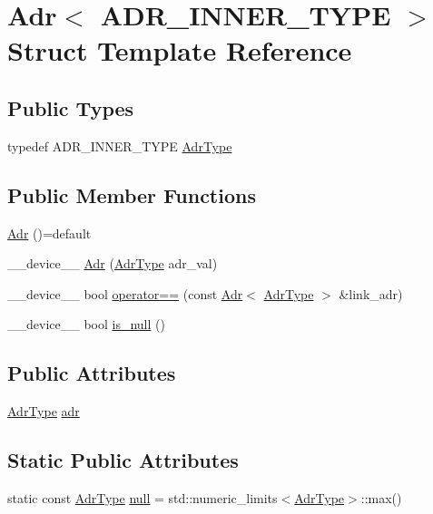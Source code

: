 \hypertarget{structAdr}{\section{Adr$<$ A\-D\-R\-\_\-\-I\-N\-N\-E\-R\-\_\-\-T\-Y\-P\-E $>$ Struct Template Reference}
\label{structAdr}
}
\subsection*{Public Types}
\begin{DoxyCompactItemize}
\item 
typedef A\-D\-R\-\_\-\-I\-N\-N\-E\-R\-\_\-\-T\-Y\-P\-E \hyperlink{structAdr_a26aee6997ae64a7e01a07cf43a9d4471}{Adr\-Type}
\end{DoxyCompactItemize}
\subsection*{Public Member Functions}
\begin{DoxyCompactItemize}
\item 
\hyperlink{structAdr_abe3fb07072b3af9f21ac00c07eca3e76}{Adr} ()=default
\item 
\-\_\-\-\_\-device\-\_\-\-\_\- \hyperlink{structAdr_a63185ea3b497f72a69ebe755b07fe910}{Adr} (\hyperlink{structAdr_a26aee6997ae64a7e01a07cf43a9d4471}{Adr\-Type} adr\-\_\-val)
\item 
\-\_\-\-\_\-device\-\_\-\-\_\- bool \hyperlink{structAdr_a4f64fcef48738e8536ee922b9943fcf0}{operator==} (const \hyperlink{structAdr}{Adr}$<$ \hyperlink{structAdr_a26aee6997ae64a7e01a07cf43a9d4471}{Adr\-Type} $>$ \&link\-\_\-adr)
\item 
\-\_\-\-\_\-device\-\_\-\-\_\- bool \hyperlink{structAdr_a9c68ece4ea0afbdd3b5a6fb3e895671f}{is\-\_\-null} ()
\end{DoxyCompactItemize}
\subsection*{Public Attributes}
\begin{DoxyCompactItemize}
\item 
\hyperlink{structAdr_a26aee6997ae64a7e01a07cf43a9d4471}{Adr\-Type} \hyperlink{structAdr_a657dd11fa4c28931f6c01f61f33db315}{adr}
\end{DoxyCompactItemize}
\subsection*{Static Public Attributes}
\begin{DoxyCompactItemize}
\item 
static const \hyperlink{structAdr_a26aee6997ae64a7e01a07cf43a9d4471}{Adr\-Type} \hyperlink{structAdr_aa33d488b824b4f0b3a77928a9dec5dba}{null} = std\-::numeric\-\_\-limits$<$\hyperlink{structAdr_a26aee6997ae64a7e01a07cf43a9d4471}{Adr\-Type}$>$\-::max()
\end{DoxyCompactItemize}


